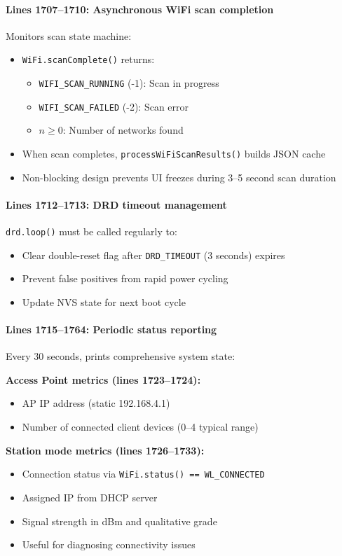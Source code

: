 \documentclass[11pt,a4paper]{article}
\begin{document}
\paragraph{Lines 1707--1710: Asynchronous WiFi scan completion}
Monitors scan state machine:
\begin{itemize}[leftmargin=*]
  \item \texttt{WiFi.scanComplete()} returns:
    \begin{itemize}
      \item \texttt{WIFI\_SCAN\_RUNNING} (-1): Scan in progress
      \item \texttt{WIFI\_SCAN\_FAILED} (-2): Scan error
      \item $n \geq 0$: Number of networks found
    \end{itemize}
  \item When scan completes, \texttt{processWiFiScanResults()} builds JSON cache
  \item Non-blocking design prevents UI freezes during 3--5 second scan duration
\end{itemize}

\paragraph{Lines 1712--1713: DRD timeout management}
\texttt{drd.loop()} must be called regularly to:
\begin{itemize}[leftmargin=*]
  \item Clear double-reset flag after \texttt{DRD\_TIMEOUT} (3 seconds) expires
  \item Prevent false positives from rapid power cycling
  \item Update NVS state for next boot cycle
\end{itemize}

\paragraph{Lines 1715--1764: Periodic status reporting}
Every 30 seconds, prints comprehensive system state:

\textbf{Access Point metrics (lines 1723--1724):}
\begin{itemize}[leftmargin=*]
  \item AP IP address (static 192.168.4.1)
  \item Number of connected client devices (0--4 typical range)
\end{itemize}

\textbf{Station mode metrics (lines 1726--1733):}
\begin{itemize}[leftmargin=*]
  \item Connection status via \texttt{WiFi.status() == WL\_CONNECTED}
  \item Assigned IP from DHCP server
  \item Signal strength in dBm and qualitative grade
  \item Useful for diagnosing connectivity issues
\end{itemize}
\end{document}
